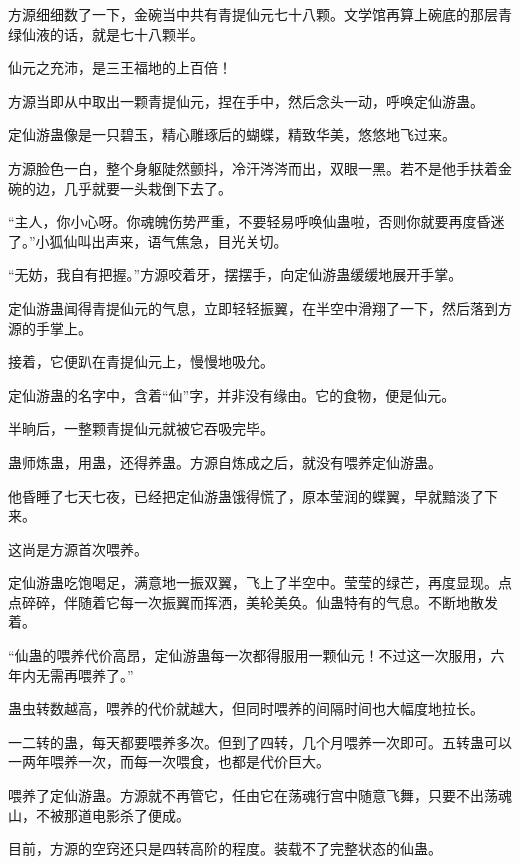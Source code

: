 
\begin{this_body}

方源细细数了一下，金碗当中共有青提仙元七十八颗。文学馆再算上碗底的那层青绿仙液的话，就是七十八颗半。

仙元之充沛，是三王福地的上百倍！

方源当即从中取出一颗青提仙元，捏在手中，然后念头一动，呼唤定仙游蛊。

定仙游蛊像是一只碧玉，精心雕琢后的蝴蝶，精致华美，悠悠地飞过来。

方源脸色一白，整个身躯陡然颤抖，冷汗涔涔而出，双眼一黑。若不是他手扶着金碗的边，几乎就要一头栽倒下去了。

“主人，你小心呀。你魂魄伤势严重，不要轻易呼唤仙蛊啦，否则你就要再度昏迷了。”小狐仙叫出声来，语气焦急，目光关切。

“无妨，我自有把握。”方源咬着牙，摆摆手，向定仙游蛊缓缓地展开手掌。

定仙游蛊闻得青提仙元的气息，立即轻轻振翼，在半空中滑翔了一下，然后落到方源的手掌上。

接着，它便趴在青提仙元上，慢慢地吸允。

定仙游蛊的名字中，含着“仙”字，并非没有缘由。它的食物，便是仙元。

半晌后，一整颗青提仙元就被它吞吸完毕。

蛊师炼蛊，用蛊，还得养蛊。方源自炼成之后，就没有喂养定仙游蛊。

他昏睡了七天七夜，已经把定仙游蛊饿得慌了，原本莹润的蝶翼，早就黯淡了下来。

这尚是方源首次喂养。

定仙游蛊吃饱喝足，满意地一振双翼，飞上了半空中。莹莹的绿芒，再度显现。点点碎碎，伴随着它每一次振翼而挥洒，美轮美奂。仙蛊特有的气息。不断地散发着。

“仙蛊的喂养代价高昂，定仙游蛊每一次都得服用一颗仙元！不过这一次服用，六年内无需再喂养了。”

蛊虫转数越高，喂养的代价就越大，但同时喂养的间隔时间也大幅度地拉长。

一二转的蛊，每天都要喂养多次。但到了四转，几个月喂养一次即可。五转蛊可以一两年喂养一次，而每一次喂食，也都是代价巨大。

喂养了定仙游蛊。方源就不再管它，任由它在荡魂行宫中随意飞舞，只要不出荡魂山，不被那道电影杀了便成。

目前，方源的空窍还只是四转高阶的程度。装载不了完整状态的仙蛊。


\end{this_body}
